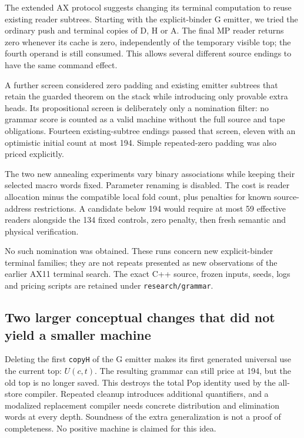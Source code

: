 \documentclass[11pt,letterpaper]{article}
\newcommand{\file}[1]{\texttt{\nolinkurl{#1}}}
\begin{document}
The extended AX protocol suggests changing its terminal computation to
reuse existing reader subtrees. Starting with the explicit-binder G
emitter, we tried the ordinary push and terminal copies of D, H or A.
The final MP reader returns zero whenever its cache is zero, independently
of the temporary visible top; the fourth operand is still consumed. This
allows several different source endings to have the same command effect.

A further screen considered zero padding and existing emitter subtrees
that retain the guarded theorem on the stack while introducing only
provable extra heads. Its propositional screen is deliberately only a
nomination filter: no grammar score is counted as a valid machine without
the full source and tape obligations. Fourteen existing-subtree endings
passed that screen, eleven with an optimistic initial count at most 194.
Simple repeated-zero padding was also priced explicitly.

The two new annealing experiments vary binary associations while keeping
their selected macro words fixed. Parameter renaming is disabled. The
cost is reader allocation minus the compatible local fold count, plus
penalties for known source-address restrictions. A candidate below 194
would require at most 59 effective readers alongside the 134 fixed
controls, zero penalty, then fresh semantic and physical verification.

No such nomination was obtained. These runs concern new explicit-binder
terminal families; they are not repeats presented as new observations of
the earlier AX11 terminal search. The exact C++ source, frozen inputs,
seeds, logs and pricing scripts are retained under \file{research/grammar}.

\subsection{Two larger conceptual changes that did not yield a smaller machine}

Deleting the first \file{copyH} of the G emitter makes its first generated
universal use the current top: $U(c,t)$. The resulting grammar can still
price at 194, but the old top is no longer saved. This destroys the total
Pop identity used by the all-store compiler. Repeated cleanup introduces
additional quantifiers, and a modalized replacement compiler needs
concrete distribution and elimination words at every depth. Soundness of
the extra generalization is not a proof of completeness. No positive
machine is claimed for this idea.
\end{document}
